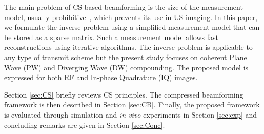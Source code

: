 \documentclass[conference]{IEEEtran}
\begin{document}
\par The main problem of CS based beamforming is the size of the measurement model, usually prohibitive~\cite{Schiffner_IUS_2012}, which prevents its use in US imaging. In this paper, we formulate the inverse problem using a simplified measurement model that can be stored as a sparse matrix. Such a measurement model allows fast reconstructions using iterative algorithms. The inverse problem is applicable to any type of transmit scheme but the present study focuses on coherent Plane Wave (PW) and Diverging Wave (DW) compounding. The proposed model is expressed for both RF and In-phase Quadrature (IQ) images.
\par Section \ref{sec:CS} briefly reviews CS principles. The compressed beamforming framework is then described in Section \ref{sec:CB}. Finally, the proposed framework is evaluated through simulation and \textit{in vivo} experiments in Section \ref{sec:exp} and concluding remarks are given in Section \ref{sec:Conc}.
\end{document}
